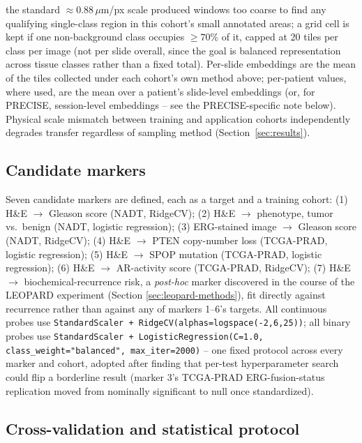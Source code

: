 the standard $\approx 0.88\,\mu$m/px scale produced windows too coarse to find any qualifying
single-class region in this cohort's small annotated areas; a grid cell is kept if one
non-background class occupies $\geq 70\%$ of it, capped at 20 tiles per class per image (not
per slide overall, since the goal is balanced representation across tissue classes rather than
a fixed total). Per-slide embeddings are the mean of the tiles collected under each cohort's own
method above; per-patient values, where used, are the mean over a patient's slide-level
embeddings (or, for PRECISE, session-level embeddings -- see the PRECISE-specific note below).
Physical scale mismatch between training and application cohorts independently degrades
transfer regardless of sampling method (Section~\ref{sec:results}).

\subsection{Candidate markers}

Seven candidate markers are defined, each as a target and a training cohort: (1) H\&E
$\rightarrow$ Gleason score (NADT, RidgeCV); (2) H\&E $\rightarrow$ phenotype, tumor vs.\
benign (NADT, logistic regression); (3) ERG-stained image $\rightarrow$ Gleason score (NADT,
RidgeCV); (4) H\&E $\rightarrow$ PTEN copy-number loss (TCGA-PRAD, logistic regression); (5)
H\&E $\rightarrow$ SPOP mutation (TCGA-PRAD, logistic regression); (6) H\&E $\rightarrow$
AR-activity score (TCGA-PRAD, RidgeCV); (7) H\&E $\rightarrow$ biochemical-recurrence risk, a
\emph{post-hoc} marker discovered in the course of the LEOPARD experiment (Section
\ref{sec:leopard-methods}), fit directly against recurrence rather than against any of markers
1--6's targets. All continuous probes use
\texttt{StandardScaler + RidgeCV(alphas=logspace(-2,6,25))}; all binary probes use
\texttt{StandardScaler + LogisticRegression(C=1.0, class\_weight="balanced", max\_iter=2000)}
-- one fixed protocol across every marker and cohort, adopted after finding that per-test
hyperparameter search could flip a borderline result (marker 3's TCGA-PRAD ERG-fusion-status
replication moved from nominally significant to null once standardized).

\subsection{Cross-validation and statistical protocol}


